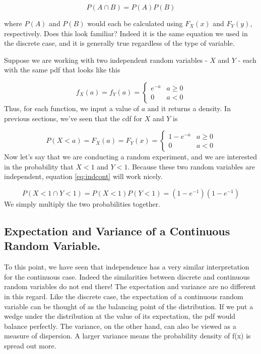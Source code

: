 \documentclass[
]{book}
\theoremstyle{definition}
\theoremstyle{definition}
\theoremstyle{definition}
\theoremstyle{definition}
\theoremstyle{remark}
\begin{document}
\[
P(A \cap B) = P(A)P(B)
\label{eq:indcont}
\]

where \(P(A)\) and \(P(B)\) would each be calculated using \(F_X(x)\) and \(F_Y(y)\), respectively. Does this look familiar? Indeed it is the same equation we used in the discrete case, and it is generally true regardless of the type of variable.

Suppose we are working with two independent random variables - \(X\) and \(Y\) - each with the same pdf that looks like this

\[
f_X(a) = f_Y(a) = 
\begin{cases}
e^{-a} & a \geq 0 \\
0 & a < 0
\end{cases}
\]
Thus, for each function, we input a value of \(a\) and it returns a density. In previous sections, we've seen that the cdf for \(X\) and \(Y\) is

\[
P(X < a) = F_X(a) = F_Y(x) =
\begin{cases}
1 - e^{-a} & a \geq 0\\
0 & a < 0
\end{cases}
\]
Now let's say that we are conducting a random experiment, and we are interested in the probability that \(X < 1\) and \(Y < 1\). Because these two random variables are independent, equation \eqref{eq:indcont} will work nicely.

\[
P({X < 1} \cap {Y < 1}) = P(X < 1)P(Y < 1) = (1-e^{-1})(1-e^{-1})
\]
We simply multiply the two probabilities together.

\subsection{Expectation and Variance of a Continuous Random Variable.}\label{expectation-and-variance-of-a-continuous-random-variable.}

To this point, we have seen that independence has a very similar interpretation for the continuous case. Indeed the similarities between discrete and continuous random variables do not end there! The expectation and variance are no different in this regard. Like the discrete case, the expectation of a continuous random variable can be thought of as the balancing point of the distribution. If we put a wedge under the distribution at the value of its expectation, the pdf would balance perfectly. The variance, on the other hand, can also be viewed as a measure of dispersion. A larger variance means the probability density of f(x) is spread out more.
\end{document}
